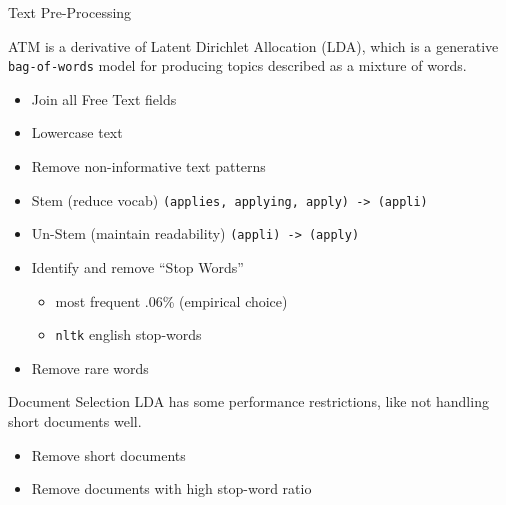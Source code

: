 \documentclass[10pt]{beamer}
\begin{document}
\begin{frame}{Text Pre-Processing}

  ATM is a derivative of Latent Dirichlet Allocation (LDA), which is a generative \texttt{bag-of-words} model for producing topics described as a mixture of words.

  \begin{itemize}
  \item Join all Free Text fields
  \item Lowercase text
  \item Remove non-informative text patterns
  \item Stem (reduce vocab) \texttt{(applies, applying, apply) -> (appli)}
  \item Un-Stem (maintain readability) \texttt{(appli) -> (apply)}
  \item Identify and remove ``Stop Words''
    \begin{itemize}
    \item most frequent .06\% (empirical choice)
    \item \texttt{nltk} english stop-words
    \end{itemize}
  \item Remove rare words
  \end{itemize}

\end{frame}

\begin{frame}{Document Selection}
  LDA has some performance restrictions, like not handling short documents well.
  \begin{itemize}
  \item Remove short documents
  \item Remove documents with high stop-word ratio
  \end{itemize}
\end{frame}
\end{document}
